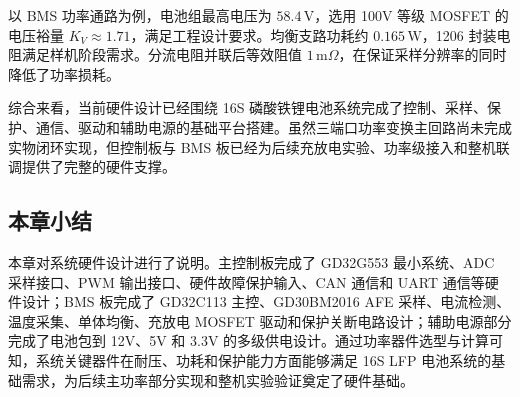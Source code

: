 以 BMS 功率通路为例，电池组最高电压为 $58.4\,\mathrm{V}$，选用 100V 等级 MOSFET 的电压裕量 $K_V\approx1.71$，满足工程设计要求。均衡支路功耗约 $0.165\,\mathrm{W}$，1206 封装电阻满足样机阶段需求。分流电阻并联后等效阻值 $1\,\mathrm{m}\Omega$，在保证采样分辨率的同时降低了功率损耗。

综合来看，当前硬件设计已经围绕 16S 磷酸铁锂电池系统完成了控制、采样、保护、通信、驱动和辅助电源的基础平台搭建。虽然三端口功率变换主回路尚未完成实物闭环实现，但控制板与 BMS 板已经为后续充放电实验、功率级接入和整机联调提供了完整的硬件支撑。

\subsection{本章小结}

本章对系统硬件设计进行了说明。主控制板完成了 GD32G553 最小系统、ADC 采样接口、PWM 输出接口、硬件故障保护输入、CAN 通信和 UART 通信等硬件设计；BMS 板完成了 GD32C113 主控、GD30BM2016 AFE 采样、电流检测、温度采集、单体均衡、充放电 MOSFET 驱动和保护关断电路设计；辅助电源部分完成了电池包到 12V、5V 和 3.3V 的多级供电设计。通过功率器件选型与计算可知，系统关键器件在耐压、功耗和保护能力方面能够满足 16S LFP 电池系统的基础需求，为后续主功率部分实现和整机实验验证奠定了硬件基础。
